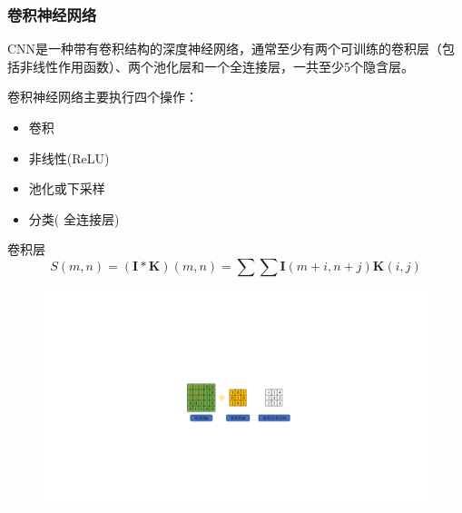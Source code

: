\subsubsection{卷积神经网络}
CNN是一种带有卷积结构的深度神经网络，通常至少有两个可训练的卷积层（包括非线性作用函数）、两个池化层和一个全连接层，一共至少5个隐含层。
\begin{note}
    卷积神经网络主要执行四个操作：
    \begin{itemize}
        \item 卷积
        \item 非线性(ReLU)
        \item 池化或下采样
        \item 分类( 全连接层)
    \end{itemize}
\end{note}
\begin{note}
    卷积层
    \[
        S(m,n) = (\boldsymbol{I}*\boldsymbol{K})(m,n) = \sum\sum \boldsymbol{I}(m+i,n+j)\boldsymbol{K}(i,j)
    \]
    \begin{figure}[htbp]
        \centering
        \includegraphics{image/卷积层.pdf}
    \end{figure}
\end{note}
